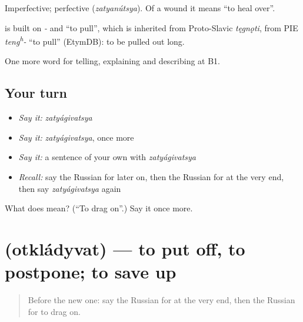 Imperfective; perfective \emph{} (\emph{zatyanútsya}). Of a wound it means \textquotedblleft{}to heal over\textquotedblright{}.

\begin{cousinweb}
\emph{} is built on \emph{-} and \emph{} \textquotedblleft{}to pull\textquotedblright{}, which is inherited from Proto-Slavic \emph{tęgnǫti}, from PIE \emph{teng\textsuperscript{h}-} \textquotedblleft{}to pull\textquotedblright{} (EtymDB): to be pulled out long.
\end{cousinweb}

\begin{grammarlens}[title={What you've built}]
One more word for telling, explaining and describing at B1.
\end{grammarlens}

\subsection*{Your turn}
\begin{itemize}
\raggedright
  \item \emph{Say it:} \emph{zatyágivatsya}
  \item \emph{Say it:} \emph{zatyágivatsya}, once more
  \item \emph{Say it:} a sentence of your own with \emph{zatyágivatsya}
  \item \emph{Recall:} say the Russian for later on, then the Russian for at the very end, then say \emph{zatyágivatsya} again
\end{itemize}

\begin{tcolorbox}[breakable,colback=teal!4,colframe=teal!35!black,title={Before you move on}]
What does  mean? (\textquotedblleft{}To drag on\textquotedblright{}.) Say it once more.
\end{tcolorbox}
\section[\texorpdfstring{\ru{откладывать} (otkládyvat)}{откладывать (otkládyvat)}]{ (otkládyvat) — to put off, to postpone; to save up}

\label{lesson:RU-C275-otkladyvat}



\begin{quote}
Before the new one: say the Russian for at the very end, then the Russian for to drag on.
\end{quote}

